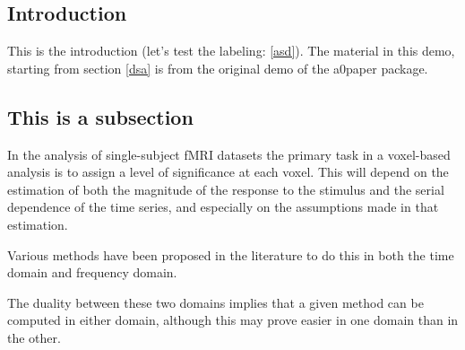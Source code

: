 \documentclass[a0,portrait]{a0poster}
\begin{document}
\begin{multicols}{3}  %

\section{Introduction \label{asd}}

This is the introduction (let's test the labeling: \ref{asd}).
The material in this demo, starting from section \ref{dsa} is from the original demo of the a0paper
package.

\subsection{This is a subsection \label{dsa}}

In the analysis of single-subject fMRI datasets the primary task in a voxel-based analysis is to assign a level of significance at each voxel. This will depend on the estimation of both the magnitude of the response to the stimulus and the serial dependence of the time series, and especially on the assumptions made in that estimation. 

Various methods have been proposed in the literature to do this in
both the time domain and frequency domain. 


\begin{center}
\end{center}

The duality between these
two domains implies that a given method can be computed in either
domain, although this may prove easier in one domain than in the
other. 


\begin{center}
\end{center}



\end{multicols}
\end{document}

